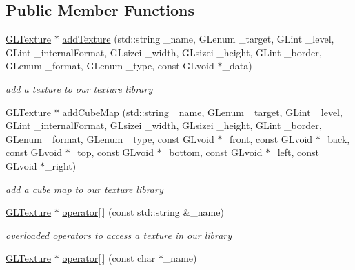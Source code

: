\subsection*{Public Member Functions}
\begin{DoxyCompactItemize}
\item 
\hyperlink{class_g_l_texture}{G\-L\-Texture} $\ast$ \hyperlink{class_g_l_texture_lib_a778cde3734906f46649defdda30d7d7e}{add\-Texture} (std\-::string \-\_\-name, G\-Lenum \-\_\-target, G\-Lint \-\_\-level, G\-Lint \-\_\-internal\-Format, G\-Lsizei \-\_\-width, G\-Lsizei \-\_\-height, G\-Lint \-\_\-border, G\-Lenum \-\_\-format, G\-Lenum \-\_\-type, const G\-Lvoid $\ast$\-\_\-data)
\begin{DoxyCompactList}\small\item\em add a texture to our texture library \end{DoxyCompactList}\item 
\hyperlink{class_g_l_texture}{G\-L\-Texture} $\ast$ \hyperlink{class_g_l_texture_lib_aece253fdd6aad02adca2d743c463a9f2}{add\-Cube\-Map} (std\-::string \-\_\-name, G\-Lenum \-\_\-target, G\-Lint \-\_\-level, G\-Lint \-\_\-internal\-Format, G\-Lsizei \-\_\-width, G\-Lsizei \-\_\-height, G\-Lint \-\_\-border, G\-Lenum \-\_\-format, G\-Lenum \-\_\-type, const G\-Lvoid $\ast$\-\_\-front, const G\-Lvoid $\ast$\-\_\-back, const G\-Lvoid $\ast$\-\_\-top, const G\-Lvoid $\ast$\-\_\-bottom, const G\-Lvoid $\ast$\-\_\-left, const G\-Lvoid $\ast$\-\_\-right)
\begin{DoxyCompactList}\small\item\em add a cube map to our texture library \end{DoxyCompactList}\item 
\hypertarget{class_g_l_texture_lib_aa18a039ee29d50ccd34a7e1f7d24ce5b}{\hyperlink{class_g_l_texture}{G\-L\-Texture} $\ast$ \hyperlink{class_g_l_texture_lib_aa18a039ee29d50ccd34a7e1f7d24ce5b}{operator\mbox{[}$\,$\mbox{]}} (const std\-::string \&\-\_\-name)}\label{class_g_l_texture_lib_aa18a039ee29d50ccd34a7e1f7d24ce5b}

\begin{DoxyCompactList}\small\item\em overloaded operators to access a texture in our library \end{DoxyCompactList}\item 
\hypertarget{class_g_l_texture_lib_ab4ab9d6def1eb2acecfbe062686ab98e}{\hyperlink{class_g_l_texture}{G\-L\-Texture} $\ast$ \hyperlink{class_g_l_texture_lib_ab4ab9d6def1eb2acecfbe062686ab98e}{operator\mbox{[}$\,$\mbox{]}} (const char $\ast$\-\_\-name)}\label{class_g_l_texture_lib_ab4ab9d6def1eb2acecfbe062686ab98e}


\end{DoxyCompactItemize}
